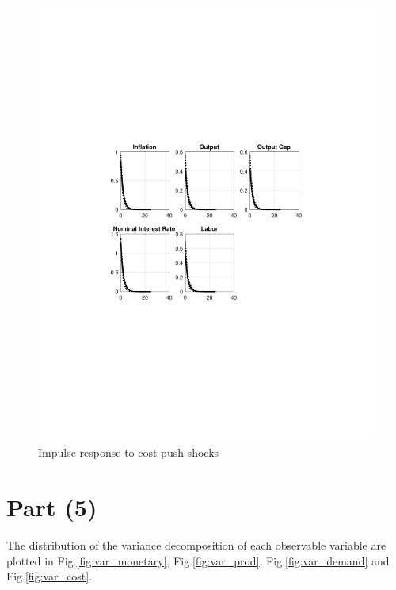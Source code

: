 \documentclass[12pt]{article}
\theoremstyle{definition}
\begin{document}
\begin{figure}[H]
	\centering
	\includegraphics[width=\linewidth, height = 0.4\textheight]{impulse_cost}
	\caption{Impulse response to cost-push shocks}
	\label{fig:impulse_cost}
\end{figure}

\section*{Part (5)}

The distribution of the variance decomposition of each observable variable are plotted in Fig.\ref{fig:var_monetary}, Fig.\ref{fig:var_prod}, Fig.\ref{fig:var_demand} and Fig.\ref{fig:var_cost}.
\end{document}
